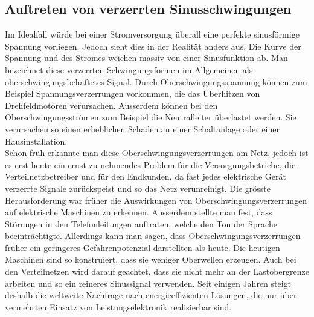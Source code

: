 \subsection{Auftreten von verzerrten Sinusschwingungen}
Im Idealfall würde bei einer Stromversorgung überall eine perfekte sinusförmige Spannung vorliegen. Jedoch sieht dies in der Realität anders aus. Die Kurve der Spannung und des Stromes weichen massiv von einer Sinusfunktion ab. Man bezeichnet diese verzerrten Schwingungsformen im Allgemeinen als oberschwingungsbehaftetes Signal. Durch Oberschwingungsspannung können zum Beispiel Spannungsverzerrungen vorkommen, die das Überhitzen von Drehfeldmotoren verursachen. Ausserdem können bei den Oberschwingungsströmen zum Beispiel die Neutralleiter überlastet werden. Sie verursachen so einen erheblichen Schaden an einer Schaltanlage oder einer Hausinstallation.\\
Schon früh erkannte man diese Oberschwingungsverzerrungen am Netz, jedoch ist es erst heute ein ernst zu nehmendes Problem für die Versorgungsbetriebe, die Verteilnetzbetreiber und für den Endkunden, da fast jedes elektrische Gerät verzerrte Signale zurückspeist und so das Netz verunreinigt. Die grösste Herausforderung war früher die Auswirkungen von Oberschwingungsverzerrungen auf elektrische Maschinen zu erkennen. Ausserdem stellte man fest, dass Störungen in den Telefonleitungen auftraten, welche den Ton der Sprache beeinträchtigte. Allerdings kann man sagen, dass Oberschwingungsverzerrungen früher ein geringeres Gefahrenpotenzial darstellten als heute. Die heutigen Maschinen sind so konstruiert, dass sie weniger Oberwellen erzeugen. Auch bei den Verteilnetzen wird darauf geachtet, dass sie nicht mehr an der Lastobergrenze arbeiten und so ein reineres Sinussignal verwenden. Seit einigen Jahren steigt deshalb die weltweite Nachfrage nach energieeffizienten Lösungen, die nur über vermehrten Einsatz von Leistungselektronik realisierbar sind. 


